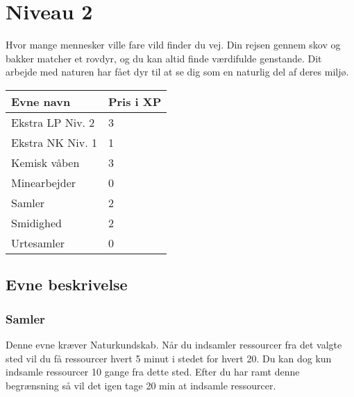 \chapter{Niveau 2}

Hvor mange mennesker ville fare vild finder du vej. Din rejsen gennem skov og bakker matcher et rovdyr, og du kan altid finde værdifulde genstande. Dit arbejde med naturen har fået dyr til at se dig som en naturlig del af deres miljø.

\begin{table}[H]
    \centering
    \begin{tabular}{|p{}|p{}|}
    \rowcolor{cerulean!80}\hline
    Evne navn & Pris i XP \\\hline
        Ekstra LP Niv. 2& 3\\\hline
        Ekstra NK Niv. 1& 1\\\hline
        Kemisk våben& 3\\\hline
        Minearbejder& 0\\\hline
        Samler& 2\\\hline
        Smidighed& 2\\\hline
        Urtesamler& 0\\\hline
    \end{tabular}
\end{table}
\section{Evne beskrivelse}





\subsection{Samler}
Denne evne kræver Naturkundskab. Når du indsamler ressourcer fra det valgte sted vil du få ressourcer hvert 5 minut i stedet for hvert 20. Du kan dog kun indsamle ressourcer 10 gange fra dette sted. Efter du har ramt denne begrænsning så vil det igen tage 20 min at indsamle ressourcer. 


